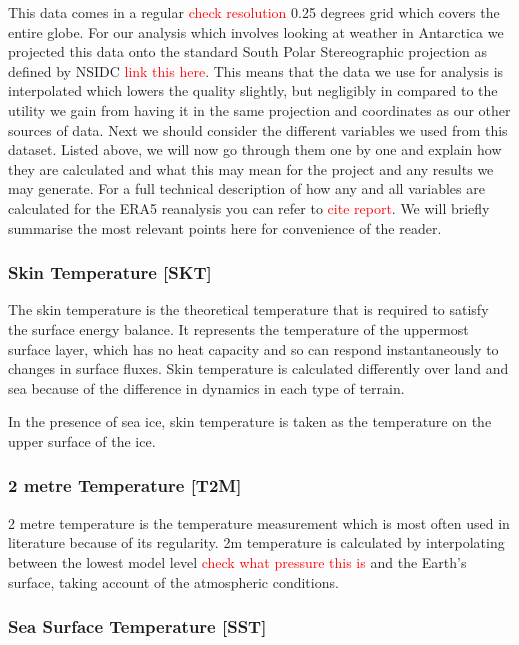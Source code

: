 \documentclass[../main.tex]{subfiles}
\begin{document}
This data comes in a regular \textcolor{red}{check resolution} 0.25 degrees grid which covers the entire globe. For our analysis which involves looking at weather in Antarctica we projected this data onto the standard South Polar Stereographic projection as defined by NSIDC \textcolor{red}{link this here}.
This means that the data we use for analysis is interpolated which lowers the quality slightly, but negligibly in compared to the utility we gain from having it in the same projection and coordinates as our other sources of data.
Next we should consider the different variables we used from this dataset. Listed above, we will now go through them one by one and explain how they are calculated and what this may mean for the project and any results we may generate.
For a full technical description of how any and all variables are calculated for the ERA5 reanalysis you can refer to \textcolor{red}{cite report}. We will briefly summarise the most relevant points here for convenience of the reader.

\subsubsection*{Skin Temperature [SKT]}

The skin temperature is the theoretical temperature that is required to satisfy the surface energy balance. It represents the temperature of the uppermost surface layer, which has no heat capacity and so can respond instantaneously to changes in surface fluxes. Skin temperature is calculated differently over land and sea because of the difference in dynamics in each type of terrain.

In the presence of sea ice, skin temperature is taken as the temperature on the upper surface of the ice.

\subsubsection*{2 metre Temperature [T2M]}

2 metre temperature is the temperature measurement which is most often used in literature because of its regularity. 2m temperature is calculated by interpolating between the lowest model level \textcolor{red}{check what pressure this is} and the Earth's surface, taking account of the atmospheric conditions.

\subsubsection*{Sea Surface Temperature [SST]}
\end{document}
